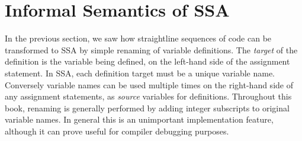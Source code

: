 




\section{Informal Semantics of SSA}



In the previous section, we saw how straightline sequences of code
can be transformed to SSA by simple renaming of variable definitions.
The \textit{target} of the definition is the variable being defined, on the
left-hand side of the assignment statement.
In SSA, each definition target must be a unique variable name.
Conversely variable names can be used multiple times
on the right-hand side of any assignment statements, as 
\textit{source} variables for definitions.
Throughout this book, renaming is generally performed by 
adding integer subscripts to original variable names.
In general this is an unimportant implementation feature,
although it can prove useful for compiler debugging purposes.


